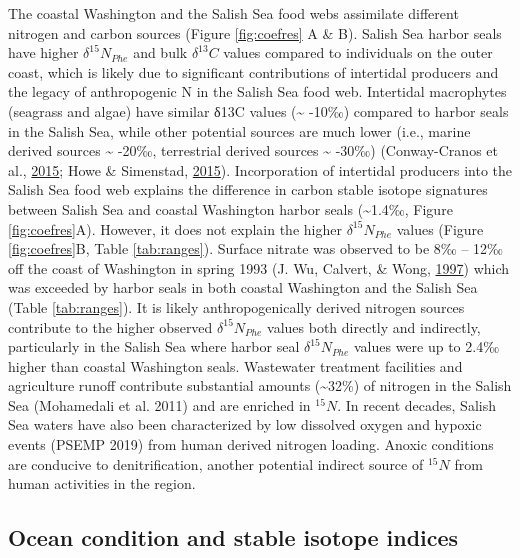 \documentclass [11pt, proquest] {uwthesis}[2015/03/03]
\begin{document}
The coastal Washington and the Salish Sea food webs assimilate different
nitrogen and carbon sources (Figure \ref{fig:coefres} A \& B). Salish
Sea harbor seals have higher \(\delta^{15}N_{Phe}\) and bulk
\(\delta^{13}C\) values compared to individuals on the outer coast,
which is likely due to significant contributions of intertidal producers
and the legacy of anthropogenic N in the Salish Sea food web. Intertidal
macrophytes (seagrass and algae) have similar δ13C values
(\textasciitilde{} -10‰) compared to harbor seals in the Salish Sea,
while other potential sources are much lower (i.e., marine derived
sources \textasciitilde{} -20‰, terrestrial derived sources
\textasciitilde{} -30‰) (Conway-Cranos et al.,
\protect\hyperlink{ref-Conway2015}{2015}; Howe \& Simenstad,
\protect\hyperlink{ref-Howe2015}{2015}). Incorporation of intertidal
producers into the Salish Sea food web explains the difference in carbon
stable isotope signatures between Salish Sea and coastal Washington
harbor seals (\textasciitilde{}1.4‰, Figure \ref{fig:coefres}A).
However, it does not explain the higher \(\delta^{15}N_{Phe}\) values
(Figure \ref{fig:coefres}B, Table \ref{tab:ranges}). Surface nitrate was
observed to be 8‰ -- 12‰ off the coast of Washington in spring 1993 (J.
Wu, Calvert, \& Wong, \protect\hyperlink{ref-Wu1997}{1997}) which was
exceeded by harbor seals in both coastal Washington and the Salish Sea
(Table \ref{tab:ranges}). It is likely anthropogenically derived
nitrogen sources contribute to the higher observed
\(\delta^{15}N_{Phe}\) values both directly and indirectly, particularly
in the Salish Sea where harbor seal \(\delta^{15}N_{Phe}\) values were
up to 2.4‰ higher than coastal Washington seals. Wastewater treatment
facilities and agriculture runoff contribute substantial amounts
(\textasciitilde{}32\%) of nitrogen in the Salish Sea (Mohamedali et al.
2011) and are enriched in \(^{15}N\). In recent decades, Salish Sea
waters have also been characterized by low dissolved oxygen and hypoxic
events (PSEMP 2019) from human derived nitrogen loading. Anoxic
conditions are conducive to denitrification, another potential indirect
source of \(^{15}N\) from human activities in the region.

\subsection{Ocean condition and stable isotope
indices}\label{ocean-condition-and-stable-isotope-indices}
\end{document}
